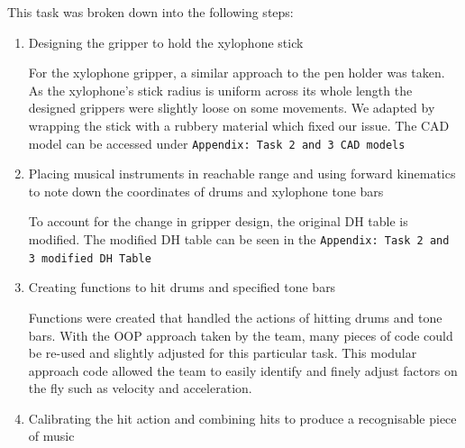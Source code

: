 \documentclass[9pt, a4paper]{article}
\begin{document}

This task was broken down into the following steps:
\begin{enumerate}
  \item Designing the gripper to hold the xylophone stick 
  
  For the xylophone gripper, a similar approach to the pen holder was taken. As the xylophone's
  stick radius is uniform across its whole length the designed grippers were
  slightly loose on some movements. We adapted by wrapping the stick with a
  rubbery material which fixed our issue. The CAD model can be accessed under
  \verb+Appendix: Task 2 and 3 CAD models+ 
  
  \item Placing musical instruments in reachable range and using forward
  kinematics to note down the coordinates of drums and xylophone tone bars
  
  To account for the change in gripper design, the original DH table is
  modified. The modified DH table can be seen in the \verb+Appendix: Task 2 and 3 modified DH Table+

  \item Creating functions to hit drums and specified tone bars 
  
  Functions were created that handled the actions of hitting drums and tone
  bars. With the OOP approach taken by the team, many pieces of code could be
  re-used and slightly adjusted for this particular task. This modular approach
  code allowed the team to easily identify and finely adjust factors on the fly such as
  velocity and acceleration. 
  
  \item Calibrating the hit action and combining hits to produce a recognisable piece of music 
  

\end{enumerate}
\end{document}
